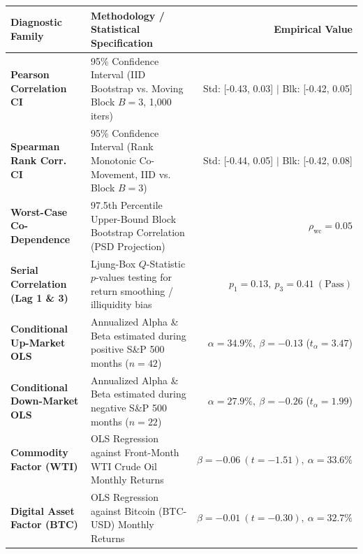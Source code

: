\documentclass[10pt,a4paper]{article}
\begin{document}
\begin{tcolorbox}[colback=white, colframe=primary, title=\textbf{\small\strut Appendix A: Extended Statistical, Bootstrap \& Factor Diagnostics}, fonttitle=\sffamily\bfseries\small, arc=5pt, boxrule=0.8pt, toptitle=4pt, bottomtitle=4pt, left=6pt, right=6pt, top=4pt, bottom=4pt, colbacktitle=primary]
\renewcommand{\arraystretch}{1.25}
\scriptsize
\begin{tabularx}{\textwidth}{l X r}
\toprule
\textbf{\textcolor{primary}{Diagnostic Family}} & \textbf{\textcolor{primary}{Methodology / Statistical Specification}} & \textbf{\textcolor{primary}{Empirical Value}} \\
\midrule
\textbf{Pearson Correlation CI} & 95\% Confidence Interval (IID Bootstrap vs. Moving Block $B=3$, 1,000 iters) & Std: [-0.43, 0.03] $\vert$ Blk: [-0.42, 0.05] \\
\rowcolor{cardbg} \textbf{Spearman Rank Corr. CI} & 95\% Confidence Interval (Rank Monotonic Co-Movement, IID vs. Block $B=3$) & Std: [-0.44, 0.05] $\vert$ Blk: [-0.42, 0.08] \\
\textbf{Worst-Case Co-Dependence} & 97.5th Percentile Upper-Bound Block Bootstrap Correlation (PSD Projection) & $\rho_{\text{wc}} = 0.05$ \\
\rowcolor{cardbg} \textbf{Serial Correlation (Lag 1 \& 3)} & Ljung-Box $Q$-Statistic $p$-values testing for return smoothing / illiquidity bias & $p_1=0.13,\ p_3=0.41\ (\text{Pass})$ \\
\textbf{Conditional Up-Market OLS} & Annualized Alpha \& Beta estimated during positive S\&P 500 months ($n=42$) & $\alpha=34.9\%,\ \beta=-0.13$ ($t_\alpha=3.47$) \\
\rowcolor{cardbg} \textbf{Conditional Down-Market OLS} & Annualized Alpha \& Beta estimated during negative S\&P 500 months ($n=22$) & $\alpha=27.9\%,\ \beta=-0.26$ ($t_\alpha=1.99$) \\
\textbf{Commodity Factor (WTI)} & OLS Regression against Front-Month WTI Crude Oil Monthly Returns & $\beta=-0.06\ (t=-1.51),\ \alpha=33.6\%$ \\
\rowcolor{cardbg} \textbf{Digital Asset Factor (BTC)} & OLS Regression against Bitcoin (BTC-USD) Monthly Returns & $\beta=-0.01\ (t=-0.30),\ \alpha=32.7\%$ \\
\bottomrule
\end{tabularx}
\end{tcolorbox}

\vspace{0.35em}
\end{document}
